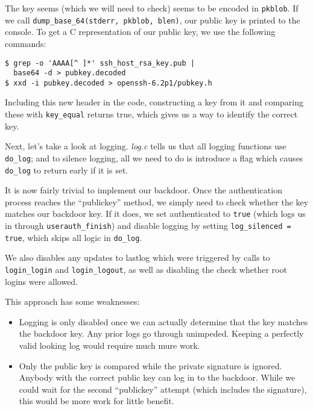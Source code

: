 \documentclass[a4paper,10pt]{article}
\begin{document}
The key seems (which we will need to check) seems to be encoded in \lstinline|pkblob|.
If we call \lstinline|dump_base_64(stderr, pkblob, blen)|, our public key is
printed to the console. To get a C representation of our public key, we use
the following commands:

\begin{verbatim}
$ grep -o 'AAAA[^ ]*' ssh_host_rsa_key.pub |
  base64 -d > pubkey.decoded
$ xxd -i pubkey.decoded > openssh-6.2p1/pubkey.h
\end{verbatim}

Including this new header in the code, constructing a key from it and comparing
these with \lstinline|key_equal| returns true, which gives us a way to identify
the correct key.

Next, let's take a look at logging. \emph{log.c} tells us that all logging functions
use \lstinline|do_log|; and to silence logging, all we need to do is introduce
a flag which causes \lstinline|do_log| to return early if it is set.

It is now fairly trivial to implement our backdoor. Once the authentication process
reaches the ``publickey'' method, we simply need to check whether the key matches
our backdoor key. If it does, we set authenticated to \lstinline|true| (which logs
us in through \lstinline|userauth_finish|) and disable logging by setting
\lstinline|log_silenced = true|, which skips all logic in \lstinline|do_log|.

We also disables any updates to lastlog which were triggered by calls to \lstinline|login_login|
and \lstinline|login_logout|, as well as disabling the check whether root logins
were allowed.

This approach has some weaknesses:

\begin{itemize}
\item Logging is only disabled once we can actually determine that the key matches
      the backdoor key. Any prior logs go through unimpeded. Keeping a perfectly
      valid looking log would require much mure work.
\item Only the public key is compared while the private signature is ignored. Anybody
      with the correct public key can log in to the backdoor. While we could wait
      for the second ``publickey'' attempt (which includes the signature), this
      would be more work for little benefit.
\end{itemize}
\end{document}
